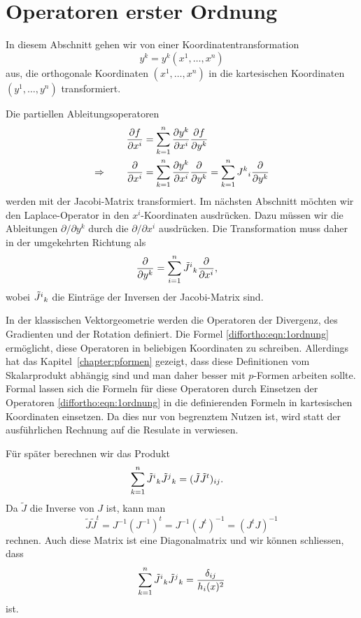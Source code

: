 %
%
%
%
\section{Operatoren erster Ordnung
\label{diffortho:section:ersteordnung}}
In diesem Abschnitt gehen wir von einer Koordinatentransformation
\[
y^k
=
y^k(x^1,\dots,x^n)
\]
aus, die orthogonale Koordinaten $(x^1,\dots,x^n)$ in die kartesischen
Koordinaten $(y^1,\dots,y^n)$ transformiert.

Die partiellen Ableitungsoperatoren
\begin{align*}
\frac{\partial f}{\partial x^i}
&=
\sum_{k=1}^n
\frac{\partial y^k}{\partial x^i}\frac{\partial f}{\partial y^k}
\\
\Rightarrow
\qquad
\frac{\partial}{\partial x^i}
&=
\sum_{k=1}^n
\frac{\partial y^k}{\partial x^i}\frac{\partial}{\partial y^k}
=
\sum_{k=1}^n
J^k\mathstrut_i \frac{\partial}{\partial y^k}
\end{align*}
werden mit der Jacobi-Matrix transformiert.
Im nächsten Abschnitt möchten wir den Laplace-Operator in den
$x^i$-Koordinaten ausdrücken.
Dazu müssen wir die Ableitungen $\partial/\partial y^k$ durch die
$\partial/\partial x^i$ ausdrücken.
Die Transformation muss daher in der umgekehrten Richtung als
\begin{align}
\frac{\partial}{\partial y^k}
&=
\sum_{i=1}^n
{\tilde J}^i\mathstrut_k
\frac{\partial}{\partial x^i},
\label{diffortho:eqn:1ordnung}
\end{align}
wobei $\tilde{J}^i\mathstrut_k$ die Einträge der Inversen der
Jacobi-Matrix sind.

In der klassischen Vektorgeometrie werden die Operatoren der
Divergenz, des Gradienten und der Rotation definiert.
Die Formel \eqref{diffortho:eqn:1ordnung} ermöglicht, diese
Operatoren in beliebigen Koordinaten zu schreiben.
Allerdings hat das Kapitel~\ref{chapter:pformen} gezeigt, dass
diese Definitionen vom Skalarprodukt abhängig sind und
man daher besser mit $p$-Formen arbeiten sollte.
Formal lassen sich die Formeln für diese Operatoren durch
Einsetzen der Operatoren \eqref{diffortho:eqn:1ordnung} in die
definierenden Formeln in kartesischen Koordinaten einsetzen.
Da dies nur von begrenztem Nutzen ist, wird statt der ausführlichen
Rechnung auf die Resulate in \cite{diffortho:ref:wikipedia} verwiesen.

Für später berechnen wir das Produkt
\begin{align*}
\sum_{k=1}^n \tilde{J}^i\mathstrut_k \tilde{J}^j\mathstrut_k
&=
(\tilde{J}\tilde{J}^t)_{ij}.
\end{align*}
Da $\tilde{J}$ die Inverse von $J$ ist, kann man 
\[
\tilde{J}\tilde{J}^t
=
J^{-1}(J^{-1})^t
=
J^{-1}(J^t)^{-1}
=
(J^tJ)^{-1}
\]
rechnen.
Auch diese Matrix ist eine Diagonalmatrix und
wir können schliessen, dass
\begin{equation}
\sum_{k=1}^n \tilde{J}^i\mathstrut_k \tilde{J}^j\mathstrut_k
=
\frac{\delta_{ij}}{h_i(x)^2}
\label{diffortho:eqn:Jij}
\end{equation}
ist.

